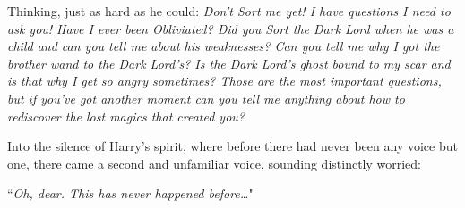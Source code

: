 Thinking, just as hard as he could: \emph{Don't Sort me yet! I have questions I need to ask you! Have I ever been Obliviated? Did you Sort the Dark Lord when he was a child and can you tell me about his weaknesses? Can you tell me why I got the brother wand to the Dark Lord's? Is the Dark Lord's ghost bound to my scar and is that why I get so angry sometimes? Those are the most important questions, but if you've got another moment can you tell me anything about how to rediscover the lost magics that created you?}

Into the silence of Harry's spirit, where before there had never been any voice but one, there came a second and unfamiliar voice, sounding distinctly worried:

``\emph{Oh, dear. This has never happened before{\ldots}}"

